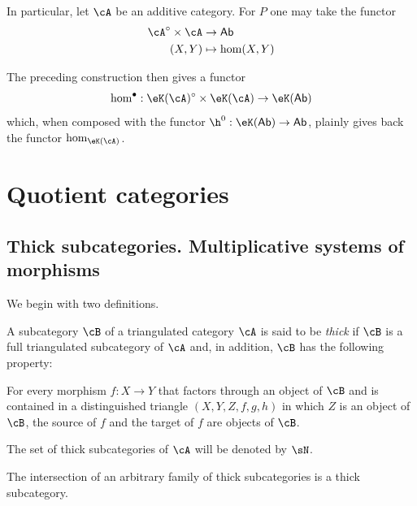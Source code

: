 \documentclass[oneside]{book}
\begin{document}
In particular, let $\cA$ be an additive category. For $P$ one may take
the functor
\begin{align*}
  \cA^\circ\times \cA &\to \mathsf{Ab} \\
  (X,Y) &\mapsto \hom(X,Y)
\end{align*}

The preceding construction then gives a functor
\[
  \hom^\bullet:\eK(\cA)^\circ \times \eK(\cA) \to \eK(\mathsf{Ab})
\]
which, when composed with the functor
$\h^0:\eK(\mathsf{Ab})\to \mathsf{Ab}$, plainly gives back the functor
$\hom_{\eK(\cA)}$.

\section{Quotient categories}\label{VIII:2}

\subsection{Thick subcategories. Multiplicative systems of morphisms}\label{VIII:2-1}

We begin with two definitions.

\begin{definition}\label{VIII:2-1-1}
A subcategory $\cB$ of a triangulated category $\cA$ is said to be
\emph{thick} if $\cB$ is a full triangulated subcategory of $\cA$ and,
in addition, $\cB$ has the following property:

For every morphism $f:X\to Y$ that factors through an object of $\cB$ and
is contained in a distinguished triangle $(X,Y,Z,f,g,h)$ in which $Z$ is
an object of $\cB$, the source of $f$ and the target of $f$ are objects of
$\cB$.
\end{definition}

The set of thick subcategories of $\cA$ will be denoted by $\sN$.

The intersection of an arbitrary family of thick subcategories is a thick
subcategory.
\end{document}
